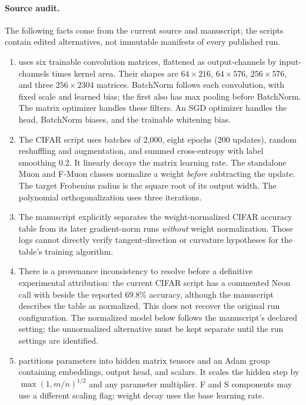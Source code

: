 \documentclass[11pt]{article}
\begin{document}
\paragraph{Source audit.}
The following facts come from the current source and manuscript; the
scripts contain edited alternatives, not immutable manifests of every
published run.
\begin{enumerate}
\item {} uses six trainable convolution
matrices, flattened as output-channels by input-channels times kernel area.
Their shapes are $64\times216$, $64\times576$, $256\times576$, and three
$256\times2304$ matrices. BatchNorm follows each convolution, with fixed
scale and learned bias; the first also has max pooling before BatchNorm.
The matrix optimizer handles these filters. An SGD optimizer handles the
head, BatchNorm biases, and the trainable whitening bias.
\item The CIFAR script uses batches of 2,000, eight epochs (200 updates),
random reshuffling and augmentation, and summed cross-entropy with label
smoothing $0.2$. It linearly decays the matrix learning rate. The standalone
Muon and F-Muon classes normalize a weight \emph{before} subtracting the
update. The target Frobenius radius is the square root of its output width.
The polynomial orthogonalization uses three iterations.
\item The manuscript explicitly separates the weight-normalized CIFAR
accuracy table from its later gradient-norm runs \emph{without} weight
normalization. Those logs cannot directly verify tangent-direction or
curvature hypotheses for the table's training algorithm.
\item There is a provenance inconsistency to resolve before a definitive
experimental attribution: the current CIFAR script has a commented Neon
call with  beside the reported 69.8\% accuracy,
although the manuscript describes the table as normalized. This does not
recover the original run configuration. The normalized model below follows
the manuscript's declared setting; the unnormalized alternative must be
kept separate until the run settings are identified.
\item {} partitions parameters into
hidden matrix tensors and an Adam group containing embeddings, output
head, and scalars. It scales the hidden step by
$\max(1,m/n)^{1/2}$ and any parameter multiplier. F and S components may
use a different scaling flag; weight decay uses the base learning rate.

\end{enumerate}
\end{document}
